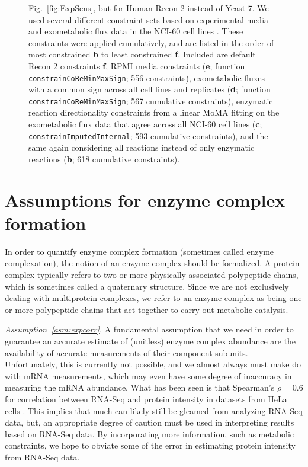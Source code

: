 \begin{figure}
{Fig.~\ref{fig:ExpSens}, but for Human Recon 2 instead of Yeast 7. We
used several different constraint sets based on experimental media and
exometabolic flux data in the NCI-60 cell lines
\citep{Jain2012}. These constraints were applied cumulatively, and are
listed in the order of most constrained \textbf{b} to least
constrained \textbf{f}. Included are default Recon 2 constraints
\textbf{f}, RPMI media constraints (\textbf{e}; function
\texttt{constrainCoReMinMaxSign}; 556 constraints), exometabolic
fluxes with a common sign across all cell lines and replicates
(\textbf{d}; function \texttt{constrainCoReMinMaxSign}; 567 cumulative
constraints), enzymatic reaction directionality constraints from a
linear MoMA fitting on the exometabolic flux data that agree across
all NCI-60 cell lines (\textbf{c};
\texttt{constrainImputed\-Internal}; 593 cumulative constraints), and
the same again considering all reactions instead of only enzymatic
reactions (\textbf{b}; 618 cumulative constraints).}
\label{fig:ExpSensRec2}
\end{figure}


\section{Assumptions for enzyme complex formation}
\label{sec:complexation}

In order to quantify enzyme complex formation (sometimes called enzyme
complexation), the notion of an enzyme complex should be formalized.
A protein complex typically refers to two or more physically
associated polypeptide chains, which is sometimes called a quaternary
structure. Since we are not exclusively dealing with multiprotein
complexes, we refer to an enzyme complex as being one or more
polypeptide chains that act together to carry out metabolic
catalysis.


\emph{Assumption~\ref{asm:expcorr}.}  A fundamental assumption
that we need in order to guarantee an accurate estimate of (unitless)
enzyme complex abundance are the availability of accurate measurements
of their component subunits. Unfortunately, this is currently not
possible, and we almost always must make do with mRNA measurements,
which may even have some degree of inaccuracy in measuring the mRNA
abundance. What has been seen is that Spearman's $\rho = 0.6$ for
correlation between RNA-Seq and protein intensity in datasets from
HeLa cells \citep{Nagaraj2011}. This implies that much can likely
still be gleamed from analyzing RNA-Seq data, but, an appropriate
degree of caution must be used in interpreting results based on
RNA-Seq data. By incorporating more information, such as metabolic
constraints, we hope to obviate some of the error in estimating
protein intensity from RNA-Seq data.

